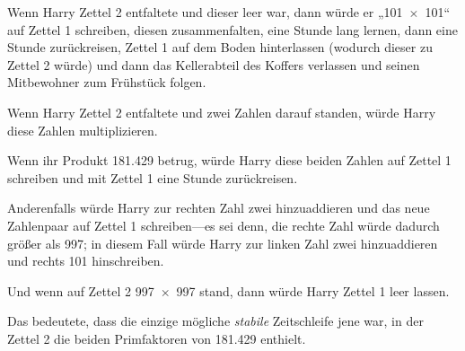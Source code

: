 Wenn Harry Zettel 2 entfaltete und dieser leer war, dann würde er „101~$\times$~101“ auf Zettel 1 schreiben, diesen zusammenfalten, eine Stunde lang lernen, dann eine Stunde zurückreisen, Zettel 1 auf dem Boden hinterlassen (wodurch dieser zu Zettel 2 würde) und dann das Kellerabteil des Koffers verlassen und seinen Mitbewohner zum Frühstück folgen.

Wenn Harry Zettel 2 entfaltete und zwei Zahlen darauf standen, würde Harry diese Zahlen multiplizieren.

Wenn ihr Produkt 181.429 betrug, würde Harry diese beiden Zahlen auf Zettel 1 schreiben und mit Zettel 1 eine Stunde zurückreisen.

Anderenfalls würde Harry zur rechten Zahl zwei hinzuaddieren und das neue Zahlenpaar auf Zettel 1 schreiben—es sei denn, die rechte Zahl würde dadurch größer als 997; in diesem Fall würde Harry zur linken Zahl zwei hinzuaddieren und rechts 101 hinschreiben.

Und wenn auf Zettel 2 997~$\times$~997 stand, dann würde Harry Zettel 1 leer lassen.

Das bedeutete, dass die einzige mögliche \emph{stabile} Zeitschleife jene war, in der Zettel 2 die beiden Primfaktoren von 181.429 enthielt.

